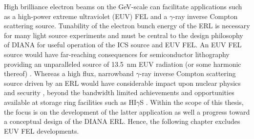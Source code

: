 \documentclass[../main.tex]{subfiles}
\begin{document}
High brilliance electron beams on the \si{\giga\electronvolt}-scale can facilitate applications such as a high-power extreme ultraviolet (EUV) FEL and a $\gamma$-ray inverse Compton scattering source. Tunability of the electron bunch energy of the ERL is necessary for many light source experiments and must be central to the design philosophy of DIANA for useful operation of the ICS source and EUV FEL. An EUV FEL source would have far-reaching consequences for semiconductor lithography providing an unparalleled source of 13.5~\si{\nano\meter} EUV radiation (or some harmonic thereof) \cite{socol2011compact}. Whereas a high flux, narrowband $\gamma$-ray inverse Compton scattering source driven by an ERL would have considerable impact upon nuclear physics and security \cite{budker2021expanding}, beyond the bandwidth limited achievements and opportunities available at storage ring facilities such as HI$\gamma$S \cite{weller2009research}. Within the scope of this thesis, the focus is on the development of the latter application as well a progress toward a conceptual design of the DIANA ERL. Hence, the following chapter excludes EUV FEL developments.
\end{document}
